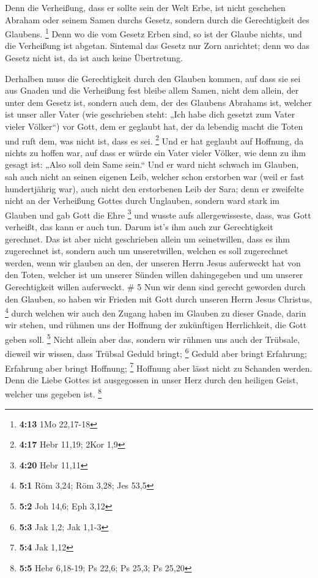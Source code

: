  Denn die Verheißung, dass er sollte sein der Welt Erbe,
ist nicht geschehen Abraham oder seinem Samen durchs Gesetz, sondern
durch die Gerechtigkeit des Glaubens. \footnote{\textbf{4:13} 1Mo
  22,17-18}  Denn wo die vom Gesetz Erben sind, so ist der
Glaube nichts, und die Verheißung ist abgetan.  Sintemal
das Gesetz nur Zorn anrichtet; denn wo das Gesetz nicht ist, da ist auch
keine Übertretung.

 Derhalben muss die Gerechtigkeit durch den Glauben kommen,
auf dass sie sei aus Gnaden und die Verheißung fest bleibe allem Samen,
nicht dem allein, der unter dem Gesetz ist, sondern auch dem, der des
Glaubens Abrahams ist, welcher ist unser aller Vater  (wie
geschrieben steht: „Ich habe dich gesetzt zum Vater vieler Völker``) vor
Gott, dem er geglaubt hat, der da lebendig macht die Toten und ruft dem,
was nicht ist, dass es sei. \footnote{\textbf{4:17} Hebr 11,19; 2Kor 1,9}
 Und er hat geglaubt auf Hoffnung, da nichts zu hoffen war,
auf dass er würde ein Vater vieler Völker, wie denn zu ihm gesagt ist:
„Also soll dein Same sein.``  Und er ward nicht schwach im
Glauben, sah auch nicht an seinen eigenen Leib, welcher schon erstorben
war (weil er fast hundertjährig war), auch nicht den erstorbenen Leib
der Sara;  denn er zweifelte nicht an der Verheißung Gottes
durch Unglauben, sondern ward stark im Glauben und gab Gott die Ehre
\footnote{\textbf{4:20} Hebr 11,11}  und wusste aufs
allergewisseste, dass, was Gott verheißt, das kann er auch tun.
 Darum ist's ihm auch zur Gerechtigkeit gerechnet.
 Das ist aber nicht geschrieben allein um seinetwillen,
dass es ihm zugerechnet ist,  sondern auch um
unseretwillen, welchen es soll zugerechnet werden, wenn wir glauben an
den, der unseren Herrn Jesus auferweckt hat von den Toten, 
welcher ist um unserer Sünden willen dahingegeben und um unserer
Gerechtigkeit willen auferweckt. \# 5  Nun wir denn sind
gerecht geworden durch den Glauben, so haben wir Frieden mit Gott durch
unseren Herrn Jesus Christus, \footnote{\textbf{5:1} Röm 3,24; Röm 3,28;
  Jes 53,5}  durch welchen wir auch den Zugang haben im
Glauben zu dieser Gnade, darin wir stehen, und rühmen uns der Hoffnung
der zukünftigen Herrlichkeit, die Gott geben soll. \footnote{\textbf{5:2}
  Joh 14,6; Eph 3,12}  Nicht allein aber das, sondern wir
rühmen uns auch der Trübsale, dieweil wir wissen, dass Trübsal Geduld
bringt; \footnote{\textbf{5:3} Jak 1,2; Jak 1,1-3}  Geduld
aber bringt Erfahrung; Erfahrung aber bringt Hoffnung; \footnote{\textbf{5:4}
  Jak 1,12}  Hoffnung aber lässt nicht zu Schanden werden.
Denn die Liebe Gottes ist ausgegossen in unser Herz durch den heiligen
Geist, welcher uns gegeben ist. \footnote{\textbf{5:5} Hebr 6,18-19; Ps
  22,6; Ps 25,3; Ps 25,20}

